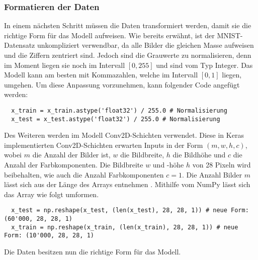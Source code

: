 \subsubsection{Formatieren der Daten}
In einem nächsten Schritt müssen die Daten transformiert werden, damit sie die
richtige Form für das Modell aufweisen.
Wie bereits erwähnt, ist der MNIST-Datensatz unkompliziert verwendbar,
da alle Bilder die gleichen Masse aufweisen und die Ziffern zentriert sind.
\para{}
Jedoch sind die Grauwerte zu normalisieren, denn im Moment liegen sie noch im
Intervall $[0, 255]$ und sind vom Typ Integer.
Das Modell kann am besten mit Kommazahlen, welche im Intervall $[0,1]$ liegen,
umgehen. Um diese Anpassung vorzunehmen, kann folgender Code angefügt werden:
\begin{verbatim}
  x_train = x_train.astype('float32') / 255.0 # Normalisierung
  x_test = x_test.astype('float32') / 255.0 # Normalisierung
\end{verbatim}
Des Weiteren werden im Modell Conv2D-Schichten verwendet. Diese in Keras
implementierten Conv2D-Schichten erwarten Inputs in der Form $(m, w, h, c)$, wobei
$m$ die Anzahl der Bilder ist, $w$ die Bildbreite, $h$ die Bildhöhe und $c$ die
Anzahl der Farbkomponenten. Die Bildbreite $w$ und -höhe $h$ von 28 Pixeln wird beibehalten, wie auch
die Anzahl Farbkomponenten $c=1$. Die Anzahl Bilder $m$ lässt sich aus der Länge
des Arrays entnehmen . Mithilfe vom NumPy lässt sich das Array wie folgt umformen.
\begin{verbatim}
  x_test = np.reshape(x_test, (len(x_test), 28, 28, 1)) # neue Form: (60'000, 28, 28, 1)
  x_train = np.reshape(x_train, (len(x_train), 28, 28, 1)) # neue Form: (10'000, 28, 28, 1)
\end{verbatim}
Die Daten besitzen nun die richtige Form für das Modell.

